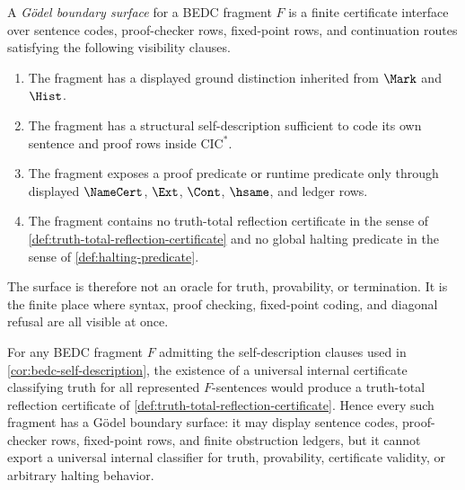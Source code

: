 \begin{definition}
\label{def:goedel-boundary-surface}
A \emph{G\"odel boundary surface} for a BEDC fragment $F$ is a finite certificate interface over sentence codes, proof-checker rows, fixed-point rows, and continuation routes satisfying the following visibility clauses.
\begin{enumerate}
\item The fragment has a displayed ground distinction inherited from $\Mark$ and $\Hist$.
\item The fragment has a structural self-description sufficient to code its own sentence and proof rows inside $\mathrm{CIC}^{*}$.
\item The fragment exposes a proof predicate or runtime predicate only through displayed $\NameCert$, $\Ext$, $\Cont$, $\hsame$, and ledger rows.
\item The fragment contains no truth-total reflection certificate in the sense of \autoref{def:truth-total-reflection-certificate} and no global halting predicate in the sense of \autoref{def:halting-predicate}.
\end{enumerate}
The surface is therefore not an oracle for truth, provability, or termination. It is the finite place where syntax, proof checking, fixed-point coding, and diagonal refusal are all visible at once.
\end{definition}

\begin{theorem}
\label{thm:goedel-boundary-as-truth-total-refusal}
For any BEDC fragment $F$ admitting the self-description clauses used in \autoref{cor:bedc-self-description}, the existence of a universal internal certificate classifying truth for all represented $F$-sentences would produce a truth-total reflection certificate of \autoref{def:truth-total-reflection-certificate}. Hence every such fragment has a G\"odel boundary surface: it may display sentence codes, proof-checker rows, fixed-point rows, and finite obstruction ledgers, but it cannot export a universal internal classifier for truth, provability, certificate validity, or arbitrary halting behavior.
\end{theorem}

